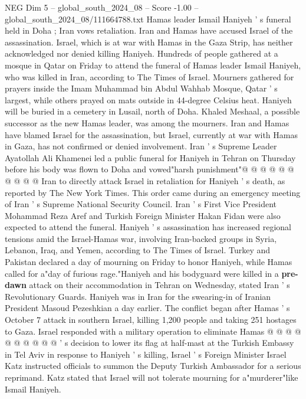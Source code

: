\begin{textsample}{NEG Dim 5 – global\_south\_2024\_08 – Score -1.00 – global\_south\_2024\_08/111664788.txt}  \label{ex:f5_neg_126}
Hamas leader Ismail Haniyeh ' s funeral held in Doha ; Iran vows retaliation.
Iran and Hamas have accused Israel of the assassination.
Israel, which is at war with Hamas in the Gaza Strip, has neither acknowledged nor denied killing Haniyeh.
Hundreds of people gathered at a mosque in Qatar on Friday to attend the funeral of Hamas leader Ismail Haniyeh, who was killed in Iran, according to The Times of Israel.
Mourners gathered for prayers inside the Imam Muhammad bin Abdul Wahhab Mosque, Qatar ' s largest, while others prayed on mats outside in 44-degree Celsius heat.
Haniyeh will be buried in a cemetery in Lusail, north of Doha.
Khaled Meshaal, a possible successor as the new Hamas leader, was among the mourners.
Iran and Hamas have blamed Israel for the assassination, but Israel, currently at war with Hamas in Gaza, has not confirmed or denied involvement.
Iran ' s Supreme Leader Ayatollah Ali Khamenei led a public funeral for Haniyeh in Tehran on Thursday before his body was flown to Doha and vowed"harsh punishment"@ @ @ @ @ @ @ @ @ @ Iran to directly attack Israel in retaliation for Haniyeh ' s death, as reported by The New York Times.
This order came during an emergency meeting of Iran ' s Supreme National Security Council.
Iran ' s First Vice President Mohammad Reza Aref and Turkish Foreign Minister Hakan Fidan were also expected to attend the funeral.
Haniyeh ' s assassination has increased regional tensions amid the Israel-Hamas war, involving Iran-backed groups in Syria, Lebanon, Iraq, and Yemen, according to The Times of Israel.
Turkey and Pakistan declared a day of mourning on Friday to honor Haniyeh, while Hamas called for a"day of furious rage."Haniyeh and his bodyguard were killed in a \textbf{pre-dawn} attack on their accommodation in Tehran on Wednesday, stated Iran ' s Revolutionary Guards.
Haniyeh was in Iran for the swearing-in of Iranian President Masoud Pezeshkian a day earlier.
The conflict began after Hamas ' s October 7 attack in southern Israel, killing 1,200 people and taking 251 hostages to Gaza.
Israel responded with a military operation to eliminate Hamas @ @ @ @ @ @ @ @ @ @ ' s decision to lower its flag at half-mast at the Turkish Embassy in Tel Aviv in response to Haniyeh ' s killing, Israel ' s Foreign Minister Israel Katz instructed officials to summon the Deputy Turkish Ambassador for a serious reprimand.
Katz stated that Israel will not tolerate mourning for a"murderer"like Ismail Haniyeh.

\end{textsample}
